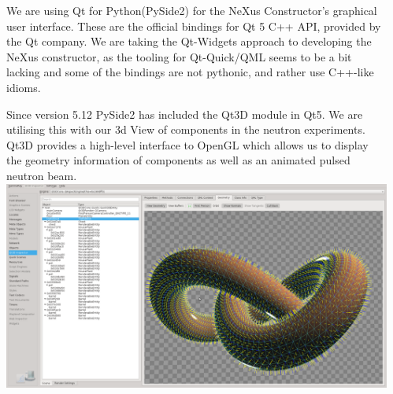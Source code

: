 \documentclass[usenames,dvipsnames]{beamer}
\begin{document}
\begin{frame}[t]
\begin{columns}[t]
\begin{column}{0.47\paperwidth}
\end{column}   

\begin{column}{0.47\paperwidth}  

\begin{tcolorbox}[colback=white,colframe=white,title=Qt for Python,coltitle=blue]
\bigskip
We are using Qt for Python(PySide2) for the NeXus Constructor's graphical user interface. These are the official bindings for Qt 5 C++ API, provided by the Qt company. 
\bigskip
We are taking the Qt-Widgets approach to developing the NeXus constructor, as the tooling for Qt-Quick/QML seems to be a bit lacking and some of the bindings are not pythonic, and rather use C++-like idioms. 
\bigskip

Since version 5.12 PySide2 has included the Qt3D module in Qt5. We are utilising this with our 3d View of components in the neutron experiments. Qt3D provides a high-level interface to OpenGL which allows us to display the geometry information of components as well as an animated pulsed neutron beam.
\bigskip
\includegraphics[width=\linewidth]{qt3d.png}
\bigskip


\end{tcolorbox}

\bigskip


\bigskip

\begin{tcolorbox}[colback=white,colframe=white,title=Conclusion,coltitle=blue]
\lipsum[2]
\end{tcolorbox}

\end{column}
\end{columns}
 
\end{frame}
\end{document}
